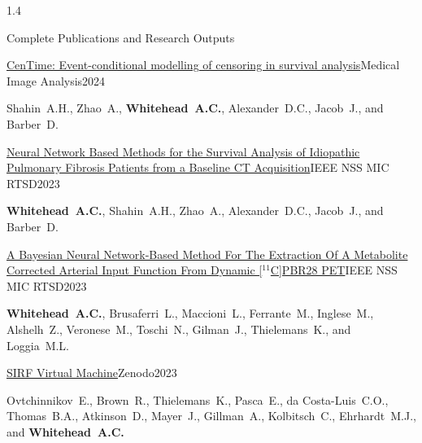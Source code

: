 \documentclass{cv}
\begin{document}
\begin{spacing}{1.4}
\begin{rSection}{Complete Publications and Research Outputs}
            \vspace{-0.5cm}
            \item \begin{rSubsection}{\href{https://doi.org/10.1016/j.media.2023.103016}{CenTime: Event-conditional modelling of censoring in survival analysis}}{}{Medical Image Analysis}{2024}
                \vspace{-0.25cm}
                \item Shahin~A.H., Zhao~A., \textbf{Whitehead~A.C.}, Alexander~D.C., Jacob~J., and Barber~D.
                \\
            \end{rSubsection}
    
            \vspace{-0.5cm}
            \item \begin{rSubsection}{\href{https://doi.org/10.1109/NSSMICRTSD49126.2023.10337922}{Neural Network Based Methods for the Survival Analysis of Idiopathic Pulmonary Fibrosis Patients from a Baseline CT Acquisition}}{}{IEEE NSS MIC RTSD}{2023}
                \vspace{-0.25cm}
                \item \textbf{Whitehead~A.C.}, Shahin~A.H., Zhao~A., Alexander~D.C., Jacob~J., and Barber~D.
                \\
            \end{rSubsection}

            \vspace{-0.5cm}
            \item \begin{rSubsection}{\href{https://doi.org/10.1109/NSSMICRTSD49126.2023.10338687}{A Bayesian Neural Network-Based Method For The Extraction Of A Metabolite Corrected Arterial Input Function From Dynamic [$^{11}$C]PBR28 PET}}{}{IEEE NSS MIC RTSD}{2023}
                \vspace{-0.25cm}
                \item \textbf{Whitehead~A.C.}, Brusaferri~L., Maccioni~L., Ferrante~M., Inglese~M., Alshelh~Z., Veronese~M., Toschi~N., Gilman~J., Thielemans~K., and Loggia~M.L.
                \\
            \end{rSubsection}
    
            \vspace{-0.5cm}
                \item \begin{rSubsection}{\href{https://doi.org/10.5281/zenodo.10033962}{SIRF Virtual Machine}}{}{Zenodo}{2023}
                    \vspace{-0.25cm}
                    \item Ovtchinnikov~E., Brown~R., Thielemans~K., Pasca~E., da Costa-Luis~C.O., Thomas~B.A., Atkinson~D., Mayer~J., Gillman~A., Kolbitsch~C., Ehrhardt~M.J., and \textbf{Whitehead~A.C.}
                    \\
                \end{rSubsection}
    

\end{rSection}
\end{spacing}
\end{document}
